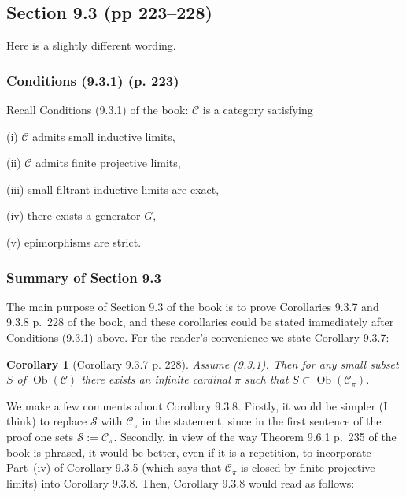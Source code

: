\documentclass[12pt]{article}%
\newtheorem{cor}[thm]{Corollary}
\theoremstyle{remark}
\theoremstyle{definition}
\newcommand{\cc}{\mathcal}
\newcommand{\C}{\mathcal C}
\DeclareMathOperator{\Ob}{Ob}
\begin{document}

\subsection{Section 9.3 (pp 223--228)}\label{s934}

Here is a slightly different wording. 

\subsubsection{Conditions (9.3.1) (p. 223)}\label{931}

Recall Conditions (9.3.1) of the book: $\C$ is a category satisfying  

(i) $\C$ admits small inductive limits,

(ii) $\C$ admits finite projective limits,

(iii) small filtrant inductive limits are exact, 

(iv) there exists a generator $G$,

(v) epimorphisms are strict.

\subsubsection{Summary of Section 9.3}

The main purpose of Section 9.3 of the book is to prove Corollaries 9.3.7 and 9.3.8 p.~228 of the book, and these corollaries could be stated immediately after Conditions (9.3.1) above. For the reader's convenience we state Corollary 9.3.7:

\begin{cor}[Corollary 9.3.7 p. 228]
Assume (9.3.1). Then for any small subset $S$ of $\Ob(\C)$ there exists an infinite cardinal $\pi$ such that $S\subset\Ob(\C_\pi)$.
\end{cor}

We make a few comments about Corollary 9.3.8. Firstly, it would be simpler (I think) to replace $\cc S$ with $\C_\pi$ in the statement, since in the first sentence of the proof one sets $\cc S:=\C_\pi$. Secondly, in view of the way Theorem 9.6.1 p.~235 of the book is phrased, it would be better, even if it is a repetition, to incorporate Part~(iv) of Corollary 9.3.5 (which says that $\C_\pi$ is closed by finite projective limits) into Corollary 9.3.8. Then, Corollary 9.3.8 would read as follows:
\end{document}

